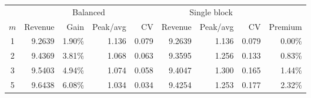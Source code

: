 \begin{tabular}{crrrrrrrr}
\toprule
&\multicolumn{4}{c}{Balanced}&\multicolumn{3}{c}{Single block}&\\
\cmidrule(lr){2-5}\cmidrule(lr){6-8}
\(m\)&Revenue&Gain&Peak/avg&CV&Revenue&Peak/avg&CV&Premium\\
\midrule
1&9.2639&1.90\%&1.136&0.079&9.2639&1.136&0.079&0.00\%\\
2&9.4369&3.81\%&1.068&0.063&9.3595&1.256&0.133&0.83\%\\
3&9.5403&4.94\%&1.074&0.058&9.4047&1.300&0.165&1.44\%\\
5&9.6438&6.08\%&1.034&0.034&9.4254&1.253&0.177&2.32\%\\
\bottomrule
\end{tabular}
